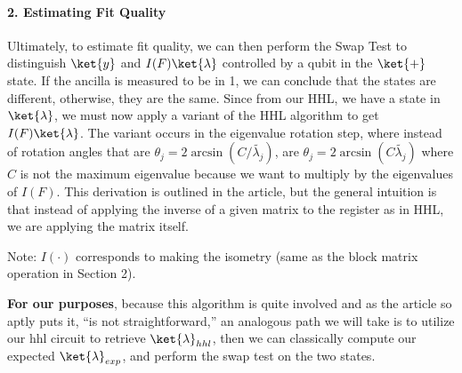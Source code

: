 \documentclass[11pt]{article}
\begin{document}
    \paragraph{\texorpdfstring{\textbf{2. Estimating Fit
Quality}}{2. Estimating Fit Quality}}\label{estimating-fit-quality}

Ultimately, to estimate fit quality, we can then perform the Swap Test
to distinguish \(\ket{y}\) and \(I(F)\ket{\lambda}\) controlled by a
qubit in the \(\ket{+}\) state. If the ancilla is measured to be in 1,
we can conclude that the states are different, otherwise, they are the
same. Since from our HHL, we have a state in \(\ket{\lambda}\), we must
now apply a variant of the HHL algorithm to get \(I(F)\ket{\lambda}\).
The variant occurs in the eigenvalue rotation step, where instead of
rotation angles that are \(\theta_j = 2\arcsin(C/\tilde{\lambda_j})\),
are \(\theta_j = 2\arcsin(C\tilde{\lambda_j})\) where \(C\) is not the
maximum eigenvalue because we want to multiply by the eigenvalues of
\(I(F)\). This derivation is outlined in the article, but the general
intuition is that instead of applying the inverse of a given matrix to
the register as in HHL, we are applying the matrix itself.

Note: \(I(\cdot)\) corresponds to making the isometry (same as the block
matrix operation in Section 2).

\textbf{For our purposes}, because this algorithm is quite involved and
as the article so aptly puts it, ``is not straightforward,'' an
analogous path we will take is to utilize our hhl circuit to retrieve
\(\ket{\lambda}_{hhl}\), then we can classically compute our expected
\(\ket{\lambda}_{exp}\), and perform the swap test on the two states.
\end{document}
